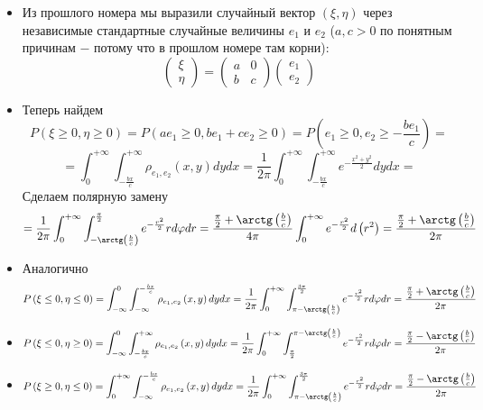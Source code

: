 \begin{itemize}
\item Из прошлого номера мы выразили случайный вектор $\left(\xi, \eta\right)$ через независимые стандартные случайные величины $e_1$ и $e_2$ ($a, c > 0$ по понятным причинам $ -$ потому что в прошлом номере там корни):
\[
    \begin{pmatrix}
    \xi \\ \eta
    \end{pmatrix} = 
    \begin{pmatrix}
    a & 0 \\ b & c
    \end{pmatrix} 
    \begin{pmatrix}
    e_1 \\ e_2
    \end{pmatrix}
\]
\item Теперь найдем
\[
    P\left(\xi \geq 0, \eta \geq 0\right) = P\left(ae_1 \geq 0, b e_1 + c e_2 \geq 0\right) = P\left(e_1 \geq 0, e_2 \geq -\frac{be_1}{c}\right) = 
\]
\[
    = \int_{0}^{+\infty} \int_{-\frac{bx}{c}}^{+\infty} \rho_{e_1, e_2}\left(x, y\right) dy dx = 
    \frac 1 {2\pi} \int_{0}^{+\infty} \int_{-\frac{bx}{c}}^{+\infty} e ^ {-\frac{x ^ 2 + y ^ 2}{2}} dy dx = 
\]
Сделаем полярную замену
\[
    =  \frac 1 {2\pi} \int_{0}^{+\infty} \int_{- \arctg\left(\frac b c\right)}^{\frac \pi 2} e ^ {-\frac{r ^ 2}{2}} r d\varphi dr
    = \frac{\frac{\pi}{2} + \arctg\left(\frac b c\right)}{4\pi} \int_{0}^{+\infty} e ^ {-\frac{r ^ 2}{2}} d \left(r ^  2\right) = \frac{\frac{\pi}{2} + \arctg\left(\frac b c\right)}{2\pi}
\]
\item Аналогично
\[
    P\left(\xi \leq 0, \eta \leq 0\right) = 
    \int_{-\infty}^{0} \int_{-\infty}^{-\frac{bx}{c}} \rho_{e_1, e_2}\left(x, y\right) dy dx = \frac 1 {2\pi} \int_{0}^{+\infty} \int_{\pi - \arctg\left(\frac b c\right)}^{\frac {3\pi} 2} e ^ {-\frac{r ^ 2}{2}} r d\varphi dr = \frac{\frac{\pi}{2} + \arctg\left(\frac b c\right)}{2\pi}
\]
\item 
\[
    P\left(\xi \leq 0, \eta \geq 0\right) = 
    \int_{-\infty}^{0} \int^{+\infty}_{-\frac{bx}{c}} \rho_{e_1, e_2}\left(x, y\right) dy dx = 
    \frac 1 {2\pi} \int_{0}^{+\infty} \int^{\pi - \arctg\left(\frac b c\right)}_{\frac {\pi} 2} e ^ {-\frac{r ^ 2}{2}} r d\varphi dr = \frac{\frac \pi 2 - \arctg\left(\frac b c\right)}{2\pi}

\]
\item 
\[
    P\left(\xi \geq 0, \eta \leq 0\right) = 
    \int^{+\infty}_{0} \int_{-\infty}^{-\frac{bx}{c}} \rho_{e_1, e_2}\left(x, y\right) dy dx = 
    \frac 1 {2\pi} \int_{0}^{+\infty} \int_{\pi - \arctg\left(\frac b c\right)}^{\frac {3\pi} 2} e ^ {-\frac{r ^ 2}{2}} r d\varphi dr = \frac{\frac \pi 2 - \arctg\left(\frac b c\right)}{2\pi}

\]
 
\end{itemize}


